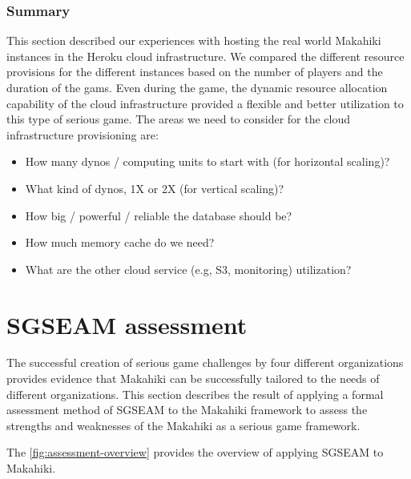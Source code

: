 \subsubsection{Summary}

This section described our experiences with hosting the real world Makahiki instances in the Heroku cloud infrastructure. We compared the different resource provisions for the different instances based on the number of players and the duration of the gams.  Even during the game, the dynamic resource allocation capability of the cloud infrastructure provided a flexible and better utilization to this type of serious game. The areas we need to consider for the cloud infrastructure provisioning are:
\begin{itemize}
\item How many dynos / computing units to start with (for horizontal scaling)?
\item What kind of dynos, 1X or 2X (for vertical scaling)? 
\item How big / powerful / reliable the database should be? 
\item How much memory cache do we need?
\item What are the other cloud service (e.g, S3, monitoring) utilization?
\end{itemize}

\section{SGSEAM assessment}

The successful creation of serious game challenges by four different organizations
provides evidence that Makahiki can be successfully tailored to the needs of different organizations. This section describes the result of applying a formal assessment method of SGSEAM to the Makahiki framework to assess the strengths and weaknesses of the Makahiki as a serious game framework.

The \autoref{fig:assessment-overview} provides the overview of applying SGSEAM to Makahiki.

